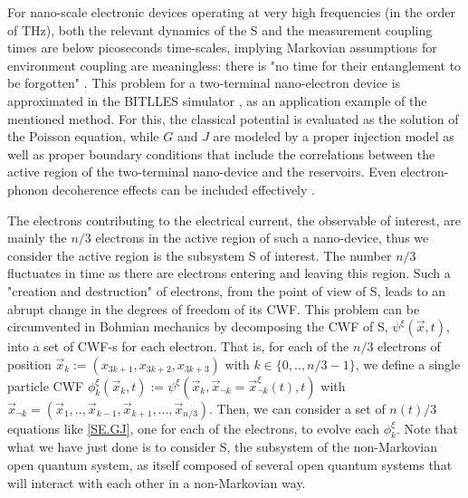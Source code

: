 \documentclass[11pt, a4paper]{article} %
\begin{document}
For nano-scale electronic devices operating at very high frequencies (in the order of THz), both the relevant dynamics of the S and the measurement coupling times are below picoseconds time-scales, implying Markovian assumptions for environment coupling are meaningless: there is "no time for their entanglement to be forgotten" \cite{Thz}. This problem for a two-terminal nano-electron device is approximated in the BITLLES simulator \cite{tdp,Pois,Thz}, as an application example of the mentioned method. For this, the classical potential is evaluated as the solution of the Poisson equation\cite{Pois}, while $G$ and $J$ are modeled by a proper injection model \cite{inject} as well as proper boundary conditions \cite{boundary1, boundary2} that include the correlations between the active region of the two-terminal nano-device and the reservoirs. Even electron-phonon decoherence effects can be included effectively \cite{eph}.

The electrons contributing to the electrical current, the observable of interest, are mainly the $n/3$ electrons in the active region of such a nano-device, thus we consider the active region is the subsystem S of interest. The number $n/3$ fluctuates in time as there are electrons entering and leaving this region. Such a "creation and destruction" of electrons, from the point of view of S, leads to an abrupt change in the degrees of freedom of its CWF. This problem can be circumvented in Bohmian mechanics by decomposing the CWF of S, $\psi^{\xi}(\vec{x},t)$, into a set of CWF-s for each electron. That is, for each of the $n/3$ electrons of position $\vec{x}_k:=(x_{3k+1}, x_{3k+2}, x_{3k+3})$ with $k\in\{0,..,n/3-1\}$, we define a single particle CWF $\phi_k^\xi(\vec{x}_k, t):=\psi^{\xi}(\vec{x}_k, \vec{x}_{\neg k}=\vec{x}_{\neg k}^\xi(t),t)$ with $\vec{x}_{\neg k}=(\vec{x}_1,..,\vec{x}_{k-1}, \vec{x}_{k+1}, ...,\vec{x}_{n/3})$. Then, we can consider a set of $n(t)/3$ equations like \eqref{SE.GJ}, one for each of the electrons, to evolve each $\phi_k^\xi$. Note that what we have just done is to consider S, the subsystem of the non-Markovian open quantum system, as itself composed of several open quantum systems that will interact with each other in a non-Markovian way.
\end{document}
